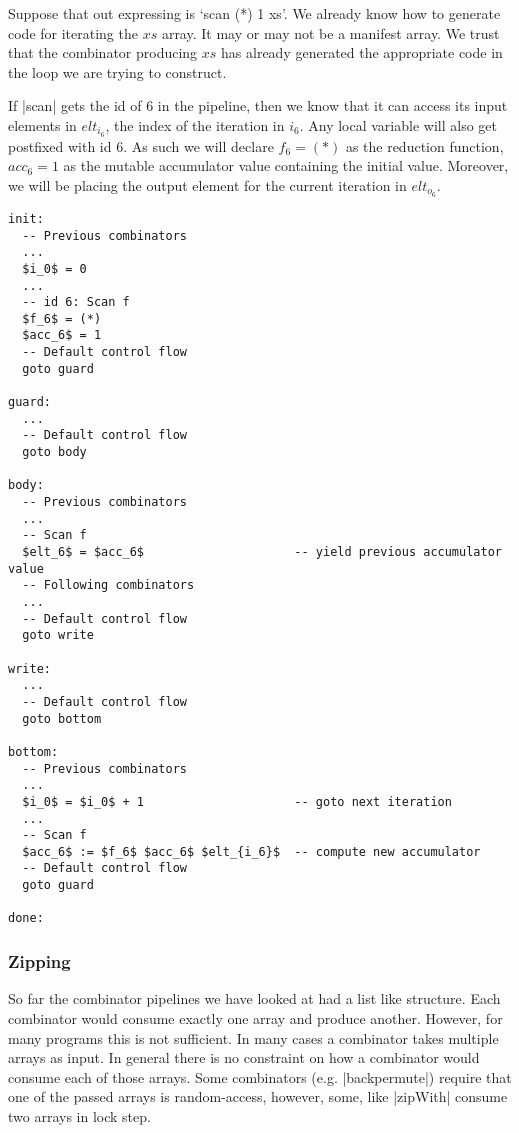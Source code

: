 Suppose that out expressing is `scan (*) 1 xs'. We already know how to generate code for iterating the $xs$ array. It may or may not be a manifest array. We trust that the combinator producing $xs$ has already generated the appropriate code in the loop we are trying to construct.

If |scan| gets the id of 6 in the pipeline, then we know that it can access its input elements in $elt_{i_6}$, the index of the iteration in $i_6$. Any local variable will also get postfixed with id 6. As such we will declare $f_6 = (*)$ as the reduction function, $acc_6 = 1$ as the mutable accumulator value containing the initial value. Moreover, we will be placing the output element for the current iteration in $elt_{o_6}$.

\begin{lstlisting}[mathescape]
init:
  -- Previous combinators
  ...
  $i_0$ = 0
  ...
  -- id 6: Scan f
  $f_6$ = (*)
  $acc_6$ = 1
  -- Default control flow
  goto guard

guard:
  ...
  -- Default control flow
  goto body

body:
  -- Previous combinators
  ...
  -- Scan f
  $elt_6$ = $acc_6$                     -- yield previous accumulator value
  -- Following combinators
  ...
  -- Default control flow
  goto write

write:
  ...
  -- Default control flow
  goto bottom

bottom:
  -- Previous combinators
  ...
  $i_0$ = $i_0$ + 1                     -- goto next iteration
  ...
  -- Scan f
  $acc_6$ := $f_6$ $acc_6$ $elt_{i_6}$  -- compute new accumulator
  -- Default control flow
  goto guard

done:

\end{lstlisting}

\subsubsection{Zipping}

So far the combinator pipelines we have looked at had a list like structure. Each combinator would consume exactly one array and produce another. However, for many programs this is not sufficient. In many cases a combinator takes multiple arrays as input. In general there is no constraint on how a combinator would consume each of those arrays. Some combinators (e.g. |backpermute|) require that one of the passed arrays is random-access, however, some, like |zipWith| consume two arrays in lock step.

